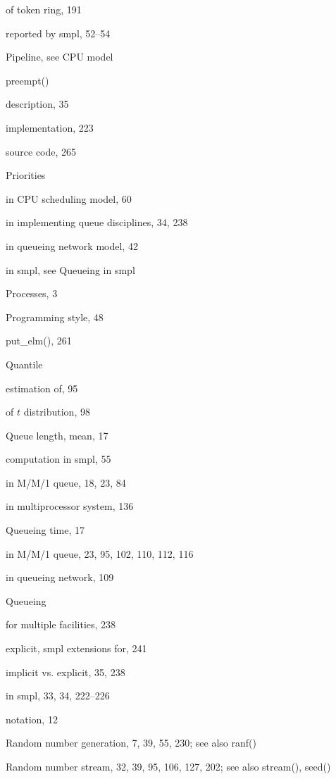 \quad of token ring, 191\par
\quad reported by smpl, 52--54\par
\noindent Pipeline, see CPU model\par
\noindent preempt()\par
\quad description, 35\par
\quad implementation, 223\par
\quad source code, 265\par
\noindent Priorities\par
\quad in CPU scheduling model, 60\par
\quad in implementing queue disciplines, 34, 238\par
\quad in queueing network model, 42\par
\quad in smpl, see Queueing in smpl\par
\noindent Processes, 3\par
\noindent Programming style, 48\par
\noindent put\_elm(), 261\par
\noindent Quantile\par
\quad estimation of, 95\par
\quad of $t$ distribution, 98\par
\noindent Queue length, mean, 17\par
\quad computation in smpl, 55\par
\quad in M/M/1 queue, 18, 23, 84\par
\quad in multiprocessor system, 136\par
\noindent Queueing time, 17\par
\quad in M/M/1 queue, 23, 95, 102, 110, 112, 116\par
\quad in queueing network, 109\par
\noindent Queueing\par
\quad for multiple facilities, 238\par
\quad explicit, smpl extensions for, 241\par
\quad implicit vs. explicit, 35, 238\par
\quad in smpl, 33, 34, 222--226\par
\quad notation, 12\par
\noindent Random number generation, 7, 39, 55, 230; see also ranf()\par
\noindent Random number stream, 32, 39, 95, 106, 127, 202; see also stream(), seed()\par
